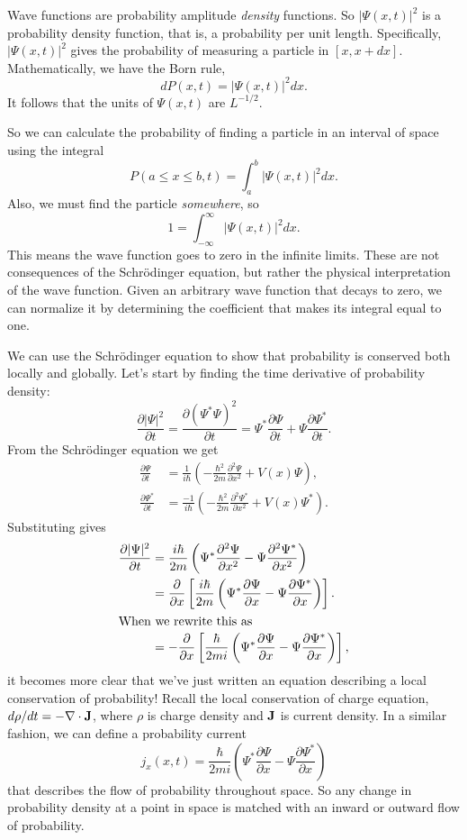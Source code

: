 \documentclass[../p052main.tex]{subfiles}
\begin{document}
Wave functions are probability amplitude \textit{density} functions.
So $|\Psi (x,t)|^2$ is a probability density function, that is, a probability per unit length.
Specifically, $|\Psi(x,t)|^2$ gives the probability of measuring a particle in $[x, x + dx]$.
Mathematically, we have the Born rule,
\[ dP(x,t) = |\Psi(x,t)|^2 dx. \]
It follows that the units of $\Psi(x,t)$ are $L^{-1/2}$.

So we can calculate the probability of finding a particle in an interval of space using the integral
\[ P(a \leq x \leq b, t) = \int_a^b |\Psi(x,t)|^2dx. \]
Also, we must find the particle \textit{somewhere}, so
\[ 1 = \int_{-\infty}^\infty |\Psi(x,t)|^2dx. \]
This means the wave function goes to zero in the infinite limits.
These are not consequences of the Schrödinger equation, but rather the physical interpretation of the wave function.
Given an arbitrary wave function that decays to zero, we can normalize it by determining the coefficient that makes its integral equal to one.

We can use the Schrödinger equation to show that probability is conserved both locally and globally.
Let's start by finding the time derivative of probability density:
\[ \frac{\partial |\Psi|^2}{\partial t} = \frac{\partial (\Psi^*\Psi)^2}{\partial t} = \Psi^* \frac{\partial \Psi}{\partial t} + \Psi \frac{\partial \Psi^*}{\partial t}. \]
From the Schrödinger equation we get
\begin{align*}
    \frac{\partial \Psi}{\partial t} &= \frac{1}{i\hbar} \left( -\frac{\hbar^2}{2m}\frac{\partial^2 \Psi}{\partial x^2} + V(x) \Psi \right), \\
    \frac{\partial \Psi^*}{\partial t} &= \frac{-1}{i\hbar} \left( -\frac{\hbar^2}{2m}\frac{\partial^2 \Psi^*}{\partial x^2} + V(x) \Psi^* \right).
\end{align*}
Substituting gives
\begin{align*}
    \frac{\partial |\Psi|^2}{\partial t} &= \frac{i\hbar}{2m} \left( \Psi^* \frac{\partial^2 \Psi}{\partial x^2} - \Psi \frac{\partial^2 \Psi^*}{\partial x^2} \right) \\
    &= \frac{\partial}{\partial x} \left[ \frac{i\hbar}{2m} \left( \Psi^* \frac{\partial \Psi}{\partial x} - \Psi \frac{\partial \Psi^*}{\partial x} \right) \right]. \\
    \intertext{When we rewrite this as}
    &= -\frac{\partial}{\partial x} \left[ \frac{\hbar}{2mi} \left( \Psi^* \frac{\partial \Psi}{\partial x} - \Psi \frac{\partial \Psi^*}{\partial x} \right) \right],
\end{align*}
it becomes more clear that we've just written an equation describing a local conservation of probability!
Recall the local conservation of charge equation, $d\rho/dt = -\nabla \cdot \mathbf{J}$, where $\rho$ is charge density and $\mathbf{J}$ is current density.
In a similar fashion, we can define a probability current
\[ j_x(x,t) = \frac{\hbar}{2mi} \left( \Psi^* \frac{\partial \Psi}{\partial x} - \Psi \frac{\partial \Psi^*}{\partial x} \right) \]
that describes the flow of probability throughout space.
So any change in probability density at a point in space is matched with an inward or outward flow of probability.
\end{document}
